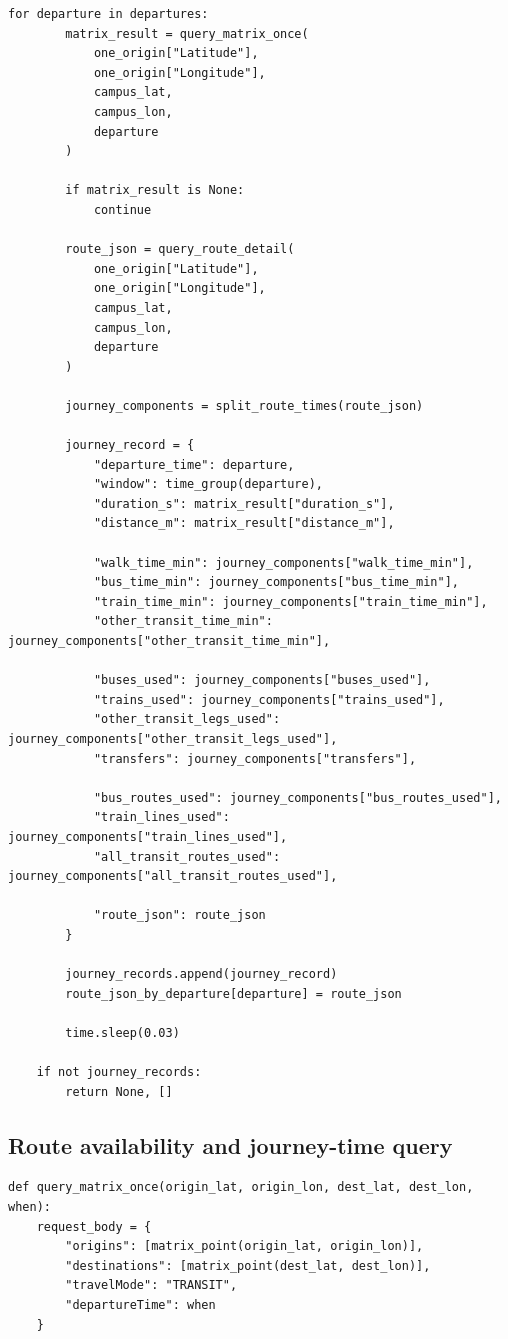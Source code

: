\documentclass[11pt,a4paper]{article}
\begin{document}
\begin{appendices}
\begin{lstlisting}[style=pythonappendix, caption={Loop over sampled departure times for each origin--campus pair}, label={lst:departure_time_loop}]
    for departure in departures:
        matrix_result = query_matrix_once(
            one_origin["Latitude"],
            one_origin["Longitude"],
            campus_lat,
            campus_lon,
            departure
        )

        if matrix_result is None:
            continue

        route_json = query_route_detail(
            one_origin["Latitude"],
            one_origin["Longitude"],
            campus_lat,
            campus_lon,
            departure
        )

        journey_components = split_route_times(route_json)

        journey_record = {
            "departure_time": departure,
            "window": time_group(departure),
            "duration_s": matrix_result["duration_s"],
            "distance_m": matrix_result["distance_m"],

            "walk_time_min": journey_components["walk_time_min"],
            "bus_time_min": journey_components["bus_time_min"],
            "train_time_min": journey_components["train_time_min"],
            "other_transit_time_min": journey_components["other_transit_time_min"],

            "buses_used": journey_components["buses_used"],
            "trains_used": journey_components["trains_used"],
            "other_transit_legs_used": journey_components["other_transit_legs_used"],
            "transfers": journey_components["transfers"],

            "bus_routes_used": journey_components["bus_routes_used"],
            "train_lines_used": journey_components["train_lines_used"],
            "all_transit_routes_used": journey_components["all_transit_routes_used"],

            "route_json": route_json
        }

        journey_records.append(journey_record)
        route_json_by_departure[departure] = route_json

        time.sleep(0.03)

    if not journey_records:
        return None, []
\end{lstlisting}

\subsection*{Route availability and journey-time query}

\begin{lstlisting}[style=pythonappendix, caption={Matrix API query for route availability and total journey time}, label={lst:matrix_query}]
def query_matrix_once(origin_lat, origin_lon, dest_lat, dest_lon, when):
    request_body = {
        "origins": [matrix_point(origin_lat, origin_lon)],
        "destinations": [matrix_point(dest_lat, dest_lon)],
        "travelMode": "TRANSIT",
        "departureTime": when
    }


\end{lstlisting}
\end{appendices}
\end{document}
